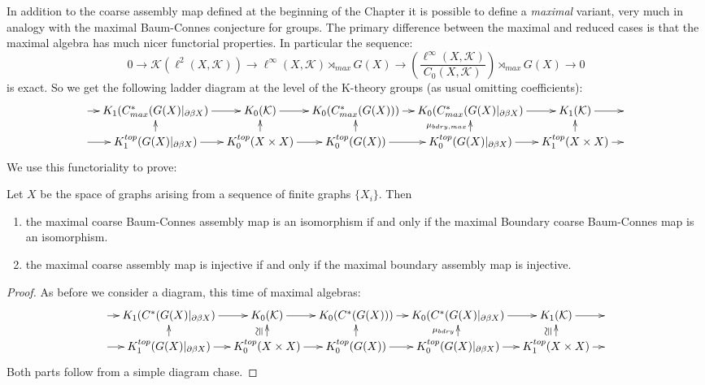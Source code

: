 In addition to the coarse assembly map defined at the beginning of the Chapter it is possible to define a \textit{maximal} variant, very much in analogy with the maximal Baum-Connes conjecture for groups. The primary difference between the maximal and reduced cases is that the maximal algebra has much nicer functorial properties. In particular the sequence:
\begin{equation*}
0 \rightarrow \mathcal{K}(\ell^{2}(X,\mathcal{K})) \rightarrow \ell^{\infty}(X,\mathcal{K})\rtimes_{max}G(X) \rightarrow (\frac{\ell^{\infty}(X,\mathcal{K})}{C_{0}(X,\mathcal{K})})\rtimes_{max}G(X) \rightarrow 0
\end{equation*}
is exact. So we get the following ladder diagram at the level of the K-theory groups (as usual omitting coefficients):
\begin{equation*}
\xymatrix@=1em{
\ar[r] & K_{1}(C^{*}_{max}(G(X)|_{\partial\beta X}) \ar[r] & K_{0}(\mathcal{K}) \ar[r]& K_{0}(C^{*}_{max}(G(X))) \ar[r]& K_{0}(C^{*}_{max}(G(X)|_{\partial\beta X})\ar[r] & K_{1}(\mathcal{K})\ar[r] &  \\
\ar[r] & K_{1}^{top}(G(X)|_{\partial\beta X}) \ar[r] \ar[u]& K_{0}^{top}(X \times X) \ar[r]\ar[u]& K_{0}^{top}(G(X)) \ar[r]\ar[u]& K_{0}^{top}(G(X)|_{\partial\beta X}) \ar[r]\ar[u]^{\mu_{bdry,max}}& K_{1}^{top}(X \times X)\ar[u]\ar[r] &
}
\end{equation*}
We use this functoriality to prove:
\begin{proposition}\label{Prop:Max}
Let $X$ be the space of graphs arising from a sequence of finite graphs $\lbrace X_{i} \rbrace$. Then
\begin{enumerate}
\item the maximal coarse Baum-Connes assembly map is an isomorphism if and only if the maximal Boundary coarse Baum-Connes map is an isomorphism.
\item the maximal coarse assembly map is injective if and only if the maximal boundary assembly map is injective.
\end{enumerate}
\end{proposition}
\begin{proof}
As before we consider a diagram, this time of maximal algebras:
\begin{equation*}
\xymatrix@=1em{
\ar[r] &K_{1}(C^{*}(G(X)|_{\partial\beta X}) \ar[r] & K_{0}(\mathcal{K}) \ar[r]& K_{0}(C^{*}(G(X))) \ar[r]& K_{0}(C^{*}(G(X)|_{\partial\beta X})\ar[r] & K_{1}(\mathcal{K})\ar[r] &  \\
\ar[r] & K_{1}^{top}(G(X)|_{\partial\beta X}) \ar[r] \ar[u]& K_{0}^{top}(X \times X) \ar[r]\ar[u]^{\ucong}& K_{0}^{top}(G(X)) \ar[r]\ar[u]& K_{0}^{top}(G(X)|_{\partial\beta X}) \ar[r]\ar[u]^{\mu_{bdry}}& K_{1}^{top}(X \times X)\ar[u]^{\ucong} \ar[r] &
}
\end{equation*}
Both parts follow from a simple diagram chase.
\end{proof}

